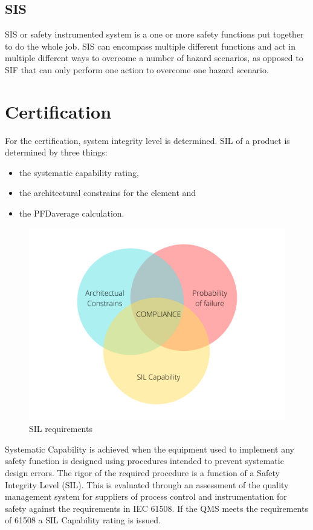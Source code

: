 \subsection{SIS}
\label{sec:sis}

SIS or safety instrumented system is a one or more safety functions put together to do the whole job. SIS can encompass multiple different functions and act in multiple different ways to overcome a number of hazard scenarios, as opposed to SIF that can only perform one action to overcome one hazard scenario.

\section{Certification}


For the certification, system integrity level is determined. SIL of a product is determined by three things\citep{func_safety_fundamentals}:
\begin{itemize}

    \item the systematic capability rating,
    \item the architectural constrains for the element and
    \item the PFDaverage calculation.
    
\end{itemize}

\begin{figure}[H]

      \centering
      \includegraphics[width=0.7\linewidth]{images/sil_requirements.png}
      \caption{SIL requirements}
      \label{fig:sil_requirements}
    
\end{figure}

Systematic Capability is achieved when the equipment used to implement any safety function is designed using procedures intended to prevent systematic design errors.  The rigor of the required procedure is a function of a Safety Integrity Level (SIL). This is evaluated through an assessment of the quality management system for suppliers of process control and instrumentation for safety against the requirements in IEC 61508.  If the QMS meets the requirements of 61508 a SIL Capability rating is issued. 

